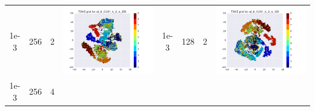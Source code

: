\documentclass[12pt]{report}
\begin{document}
\begin{table}[H]
\begin{tabular}{ | c | c | c | c || c | c | c| c |}
\begin{minipage}{.3\textwidth}
    \end{minipage}
    \\ \hline
    1e-3 & 256 & 2 &
    \begin{minipage}{.3\textwidth}
      \includegraphics[scale=0.25]{cd_lr_0_001_k_2_n_256.png}
    \end{minipage}
    & 1e-3 & 128 & 2 &
    \begin{minipage}{.3\textwidth}
      \includegraphics[scale=0.25]{cd_lr_0_001_k_2_n_128.png}
    \end{minipage}
    \\ \hline
    1e-3 & 256 & 4 &
    \begin{minipage}{.3\textwidth}

\end{minipage}
\end{tabular}
\end{table}
\end{document}
